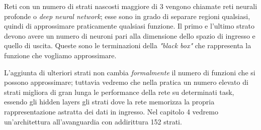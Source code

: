 Reti con un numero di strati nascosti maggiore di 3 vengono chiamate reti neurali profonde o \emph{deep neural network}; esse sono in grado di separare regioni qualsiasi, quindi di approssimare praticamente qualsiasi funzione. Il primo e l’ultimo strato devono avere un numero di neuroni pari alla dimensione dello spazio di ingresso e quello di uscita. Queste sono le terminazioni della \emph{"black box"} che rappresenta la funzione che vogliamo approssimare. 

L'aggiunta di ulteriori strati non cambia \emph{formalmente} il numero di funzioni che si possono approssimare; tuttavia vedremo che nella pratica un numero elevato di strati migliora di gran lunga le performance della rete su determinati task, essendo gli hidden layers gli strati dove la rete memorizza la propria rappresentazione astratta dei dati in ingresso. Nel capitolo 4 vedremo un'architettura all'avanguardia con addirittura 152 strati.
 

